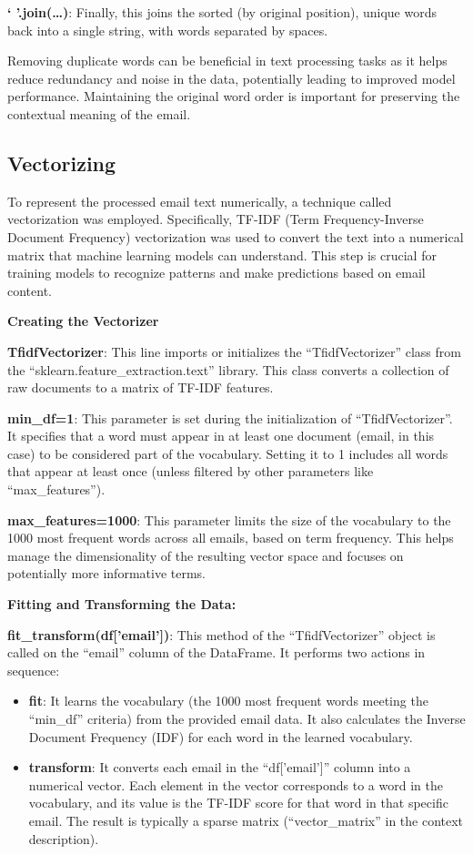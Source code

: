 \textbf{` '.join(\dots)}: Finally, this joins the sorted (by original position), unique words back into a single string, with words separated by spaces.

Removing duplicate words can be beneficial in text processing tasks as it helps reduce redundancy and noise in the data, potentially leading to improved model performance.
Maintaining the original word order is important for preserving the contextual meaning of the email.

\subsection{Vectorizing}
\label{subsec:vectorizing}

To represent the processed email text numerically, a technique called vectorization was employed.
Specifically, TF-IDF (Term Frequency-Inverse Document Frequency) vectorization was used to convert the text into a numerical matrix that machine learning models can understand.
This step is crucial for training models to recognize patterns and make predictions based on email content.

\textbf{Creating the Vectorizer}

\textbf{TfidfVectorizer}: This line imports or initializes the ``TfidfVectorizer'' class from the ``sklearn.feature\_extraction.text'' library.
This class converts a collection of raw documents to a matrix of TF-IDF features.

\textbf{min\_df=1}: This parameter is set during the initialization of ``TfidfVectorizer''.
It specifies that a word must appear in at least one document (email, in this case) to be considered part of the vocabulary.
Setting it to 1 includes all words that appear at least once (unless filtered by other parameters like ``max\_features'').

\textbf{max\_features=1000}: This parameter limits the size of the vocabulary to the 1000 most frequent words across all emails, based on term frequency.
This helps manage the dimensionality of the resulting vector space and focuses on potentially more informative terms.

\textbf{Fitting and Transforming the Data:}

\textbf{fit\_transform(df['email'])}: This method of the ``TfidfVectorizer'' object is called on the ``email'' column of the DataFrame.
It performs two actions in sequence:
\begin{itemize}
    \item \textbf{fit}: It learns the vocabulary (the 1000 most frequent words meeting the ``min\_df'' criteria) from the provided email data.
    It also calculates the Inverse Document Frequency (IDF) for each word in the learned vocabulary.
    \item \textbf{transform}: It converts each email in the ``df['email']'' column into a numerical vector.
    Each element in the vector corresponds to a word in the vocabulary, and its value is the TF-IDF score for that word in that specific email.
    The result is typically a sparse matrix (``vector\_matrix'' in the context description).
\end{itemize}

